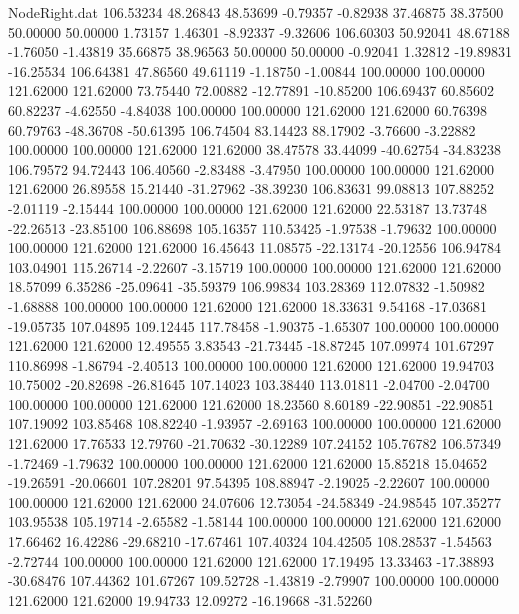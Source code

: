 \begin{filecontents}{NodeRight.dat}
 106.53234   48.26843   48.53699    -0.79357   -0.82938   37.46875   38.37500   50.00000   50.00000    1.73157    1.46301   -8.92337   -9.32606
 106.60303   50.92041   48.67188    -1.76050   -1.43819   35.66875   38.96563   50.00000   50.00000   -0.92041    1.32812  -19.89831  -16.25534
 106.64381   47.86560   49.61119    -1.18750   -1.00844  100.00000  100.00000  121.62000  121.62000   73.75440   72.00882  -12.77891  -10.85200
 106.69437   60.85602   60.82237    -4.62550   -4.84038  100.00000  100.00000  121.62000  121.62000   60.76398   60.79763  -48.36708  -50.61395
 106.74504   83.14423   88.17902    -3.76600   -3.22882  100.00000  100.00000  121.62000  121.62000   38.47578   33.44099  -40.62754  -34.83238
 106.79572   94.72443  106.40560    -2.83488   -3.47950  100.00000  100.00000  121.62000  121.62000   26.89558   15.21440  -31.27962  -38.39230
 106.83631   99.08813  107.88252    -2.01119   -2.15444  100.00000  100.00000  121.62000  121.62000   22.53187   13.73748  -22.26513  -23.85100
 106.88698  105.16357  110.53425    -1.97538   -1.79632  100.00000  100.00000  121.62000  121.62000   16.45643   11.08575  -22.13174  -20.12556
 106.94784  103.04901  115.26714    -2.22607   -3.15719  100.00000  100.00000  121.62000  121.62000   18.57099    6.35286  -25.09641  -35.59379
 106.99834  103.28369  112.07832    -1.50982   -1.68888  100.00000  100.00000  121.62000  121.62000   18.33631    9.54168  -17.03681  -19.05735
 107.04895  109.12445  117.78458    -1.90375   -1.65307  100.00000  100.00000  121.62000  121.62000   12.49555    3.83543  -21.73445  -18.87245
 107.09974  101.67297  110.86998    -1.86794   -2.40513  100.00000  100.00000  121.62000  121.62000   19.94703   10.75002  -20.82698  -26.81645
 107.14023  103.38440  113.01811    -2.04700   -2.04700  100.00000  100.00000  121.62000  121.62000   18.23560    8.60189  -22.90851  -22.90851
 107.19092  103.85468  108.82240    -1.93957   -2.69163  100.00000  100.00000  121.62000  121.62000   17.76533   12.79760  -21.70632  -30.12289
 107.24152  105.76782  106.57349    -1.72469   -1.79632  100.00000  100.00000  121.62000  121.62000   15.85218   15.04652  -19.26591  -20.06601
 107.28201   97.54395  108.88947    -2.19025   -2.22607  100.00000  100.00000  121.62000  121.62000   24.07606   12.73054  -24.58349  -24.98545
 107.35277  103.95538  105.19714    -2.65582   -1.58144  100.00000  100.00000  121.62000  121.62000   17.66462   16.42286  -29.68210  -17.67461
 107.40324  104.42505  108.28537    -1.54563   -2.72744  100.00000  100.00000  121.62000  121.62000   17.19495   13.33463  -17.38893  -30.68476
 107.44362  101.67267  109.52728    -1.43819   -2.79907  100.00000  100.00000  121.62000  121.62000   19.94733   12.09272  -16.19668  -31.52260

\end{filecontents}
